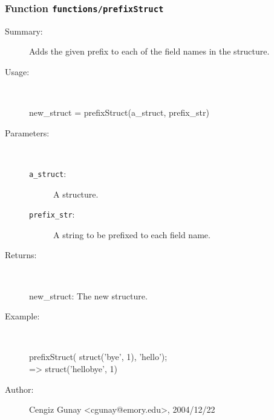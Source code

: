 \subsubsection[Function \texttt{prefixStruct}]{Function \texttt{functions/prefixStruct}}%
%
\label{ref_functions__prefixStruct}%
\hypertarget{ref_functions__prefixStruct}{}%
\begin{description}
\item[Summary:]Adds the given prefix to each of the field names in the structure.
%
\item[Usage:]~%
\begin{lyxcode}%
new\_struct = prefixStruct(a\_struct, prefix\_str)
%
\end{lyxcode}%
%
%
\item[Parameters:]~
\begin{description}%
\item[\texttt{a\_struct}:]
 A structure.
\item[\texttt{prefix\_str}:]
 A string to be prefixed to each field name.
\end{description}%
%
\item[Returns:]~

 	new\_struct: The new structure.
%
\item[Example:]~
\begin{lyxcode} prefixStruct( struct('bye', 1), 'hello');\\%
  => struct('hellobye', 1)\\%
\end{lyxcode}
%
%
\item[Author:]%
Cengiz Gunay <cgunay@emory.edu>, 2004/12/22%
\end{description}
\methodline%
